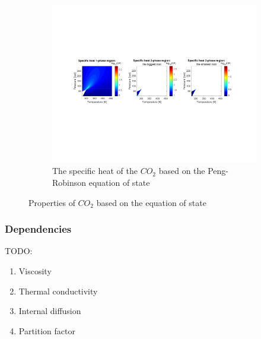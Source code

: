 \documentclass[../Parameter_fitting.tex]{subfiles}
\begin{document}
\begin{figure}[h!]
				\hfill
				\begin{subfigure}[b]{\textwidth}
					\centering
					\includegraphics[trim = 2.9cm 7cm 3.cm 7cm,clip,width=\textwidth]{Figures/CP.pdf}	
					\caption{The specific heat of the $CO_2$ based on the Peng-Robinson equation of state}
				\end{subfigure}
				\caption{Properties of $CO_2$ based on the equation of state}
				\label{fig: SFE_Properties}
			\end{figure}
			
			\subsubsection{Dependencies} \label{CH: Dependencies}
			
			TODO:
			
			\begin{enumerate}
				\item Viscosity
				\item Thermal conductivity
				\item Internal diffusion
				\item Partition factor
			\end{enumerate}
			
\end{document}
